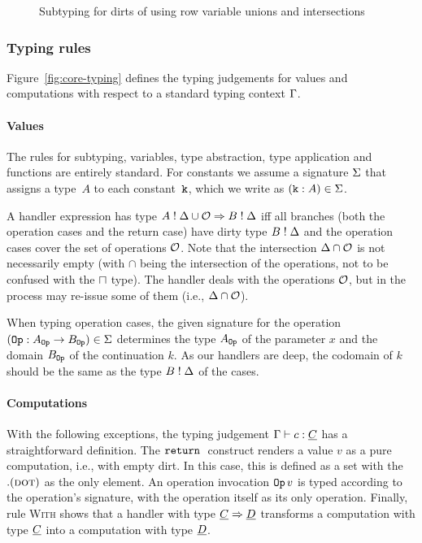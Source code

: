 \begin{figure}[h!]
\begin{center}
{\begin{minipage}{0.95\columnwidth}
\begin{mathpar}

\end{mathpar}
\end{minipage}
}
\end{center}
\caption{Subtyping for dirts of \core using row variable unions and intersections}\label{fig:core-subtyping-dirt2}
\end{figure}

\subsubsection{Typing rules}
Figure~\ref{fig:core-typing} defines the typing judgements for values and computations with respect to a standard typing context $\ctx$.

\paragraph{Values}
The rules for subtyping, variables, type abstraction, type application and functions are entirely standard. For constants we assume a signature $\sig$ that assigns a type~$A$ to each constant~$\const$, which we write as $(\const \T A) \in \sig$.

A handler expression has type $A \E \dirt \cup \ops \hto B \E \dirt$ iff all branches (both the operation cases and the return case) have dirty type $B \E \dirt$ and the operation cases cover the set of operations $\ops$. Note that the intersection $\dirt \cap \ops$ is not necessarily empty (with $\cap$ being the intersection of the operations, not to be confused with the $\intersection$ type). The handler deals with the operations $\ops$, but in the process may re-issue some of them (i.e., $\dirt \cap \ops$).

When typing operation cases, the given signature for the operation $(\op \T A_\op \to B_\op) \in \sig$ determines the type $A_\op$ of the parameter $x$ and the domain $B_\op$ of the continuation $k$. As our handlers are deep, the codomain of $k$ should be the same as the type $B \E \dirt$ of the cases.

\paragraph{Computations}
With the following exceptions, the typing judgement $\ctx \ent c : \C$ has a straightforward definition. The $\ret$ construct renders a value $v$ as a pure computation, i.e., with empty dirt. In this case, this is defined as a set with the $\dirtend$ as the only element. An operation invocation $\op\,v$ is typed according to the operation's signature, with the operation itself as its only operation. Finally, rule \textsc{With} shows that a handler with type $\C \hto \D$ transforms a computation with type $\C$ into a computation with type $\D$.

